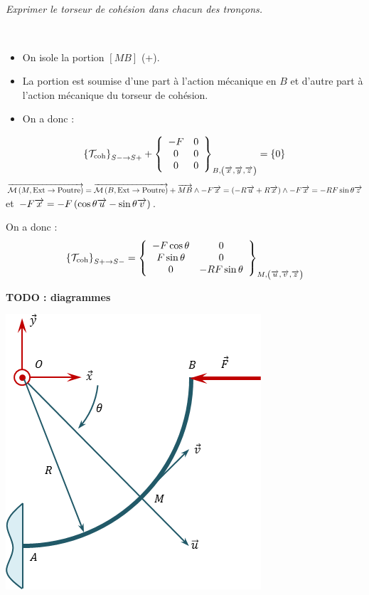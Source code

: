 \documentclass[10pt,fleqn]{article} %
\begin{document}
\begin{multicols}{1}
\subparagraph{}
\textit{Exprimer le torseur de cohésion dans chacun des tronçons.}
\ifprof
\begin{corrige}
 ~\\
\begin{itemize}[label=,font=\color{ocre}] 
\item On isole la portion $[MB]$ (+).
\item La portion est soumise d'une part à l'action mécanique en $B$ et d'autre part à l'action mécanique du torseur de cohésion.
\item On a donc : 
\end{itemize}
$$
\torseurscoh_{S-\rightarrow S+} +
 \torseurcol{-F}{0}{0}{0}{0}{0}{B,\left( \vect{x},\vect{y},\vect{z} \right)} 
 = \{0\}
$$
%
$\vectm{M}{\text{Ext}}{\text{Poutre}}
=\vectm{B}{\text{Ext}}{\text{Poutre}} + \vect{MB}  \wedge -F \vect{x} 
=\left( -R\vect{u} + R\vect{x}\right) \wedge -F \vect{x} 
=  - RF \sin \theta \vect{z}
$  et $-F \vect{x}  = -F \left( \cos \theta \vect{u}-\sin \theta \vect{v} \right) $.

On a donc :
$$
\torseurscoh_{S+\rightarrow S-} 
= 
 \torseurcol{-F\cos \theta }{F\sin \theta }{0}{0}{0}{ - RF \sin \theta}{M,\left( \vect{u},\vect{v},\vect{z} \right)} 
$$

\textbf{TODO : diagrammes}
\end{corrige}
\else 
\fi


\ifprof
\else
\begin{center}
\includegraphics[width=.4\textwidth]{images/exo_04}
\end{center}
\fi




\end{multicols}
\end{document}

